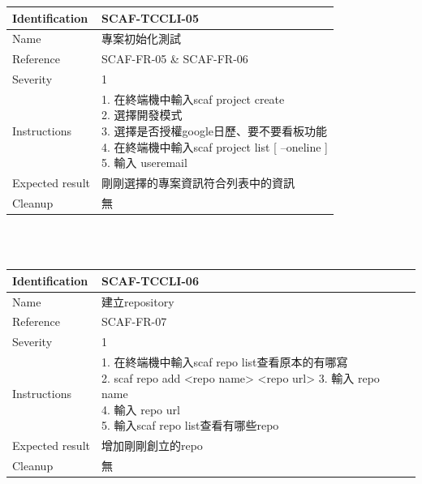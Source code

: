 \documentclass{report}
\begin{document}
\begin{tabularx}{\textwidth}{
  |p{}%
  |p{}|%
  }
  \hline
  \centering Identification &  SCAF-TCCLI-05 \\
  \hline
  \centering Name & 專案初始化測試 \\
  \hline
  \centering Reference & SCAF-FR-05 \& SCAF-FR-06 \\
  \hline
  \centering Severity & 1 \\
  \hline
  \centering Instructions & 
  \makecell[l]{
    1. 在終端機中輸入scaf project create \\
    2. 選擇開發模式 \\
    3. 選擇是否授權google日歷、要不要看板功能 \\
    4. 在終端機中輸入scaf project list [ --oneline ]  \\
    5. 輸入 useremail \\
  }\\
  \hline
  \centering Expected result & 剛剛選擇的專案資訊符合列表中的資訊 \\
  \hline
  \centering Cleanup & 無 \\
  \hline
\end{tabularx}
\\
\newline
\\


\begin{tabularx}{\textwidth}{
  |p{}%
  |p{}|%
  }
  \hline
  \centering Identification &  SCAF-TCCLI-06 \\
  \hline
  \centering Name & 建立repository \\
  \hline
  \centering Reference & SCAF-FR-07 \\
  \hline
  \centering Severity & 1 \\
  \hline
  \centering Instructions & 
  \makecell[l]{
    1. 在終端機中輸入scaf repo list查看原本的有哪寫 \\
    2. scaf repo add <repo name> <repo url>
    3. 輸入 repo name \\
    4. 輸入 repo url \\
    5. 輸入scaf repo list查看有哪些repo \\
  }\\
  \hline
  \centering Expected result & 增加剛剛創立的repo \\
  \hline
  \centering Cleanup & 無 \\
  \hline
\end{tabularx}
\\
\newline
\\
\end{document}
